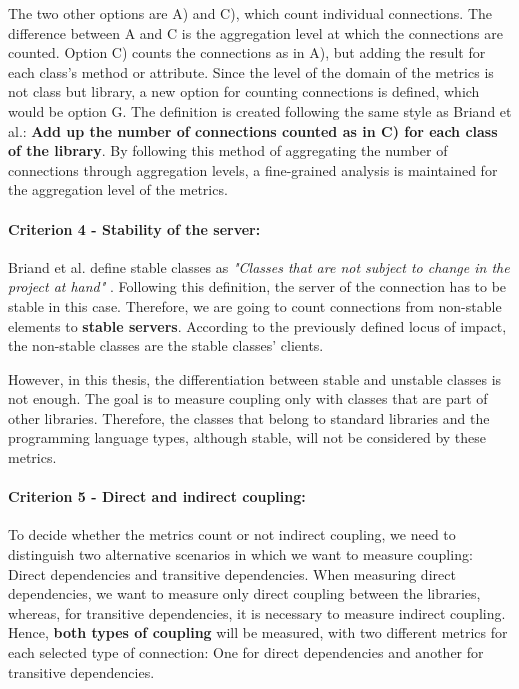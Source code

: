 The two other options are A) and C), which count individual connections. The difference between A and C is the aggregation level at which the connections are counted. Option C) counts the connections as in A), but adding the result for each class's method or attribute. Since the level of the domain of the metrics is not class but library, a new option for counting connections is defined, which would be option G. The definition is created following the same style as Briand et al.: \textbf{Add up the number of connections counted as in C) for each class of the library}. By following this method of aggregating the number of connections through aggregation levels, a fine-grained analysis is maintained for the aggregation level of the metrics.

\paragraph{Criterion 4 - Stability of the server:}
Briand et al. define stable classes as \textit{"Classes that are not subject to change in the project at hand"} \cite{briand1999unified}. Following this definition, the server of the connection has to be stable in this case. Therefore, we are going to count connections from non-stable elements to \textbf{stable servers}. According to the previously defined locus of impact, the non-stable classes are the stable classes' clients.

However, in this thesis, the differentiation between stable and unstable classes is not enough. The goal is to measure coupling only with classes that are part of other libraries. Therefore, the classes that belong to standard libraries and the programming language types, although stable, will not be considered by these metrics.

\paragraph{Criterion 5 - Direct and indirect coupling:}
To decide whether the metrics count or not indirect coupling, we need to distinguish two alternative scenarios in which we want to measure coupling: Direct dependencies and transitive dependencies. When measuring direct dependencies, we want to measure only direct coupling between the libraries, whereas, for transitive dependencies, it is necessary to measure indirect coupling. Hence, \textbf{both types of coupling} will be measured, with two different metrics for each selected type of connection: One for direct dependencies and another for transitive dependencies.

